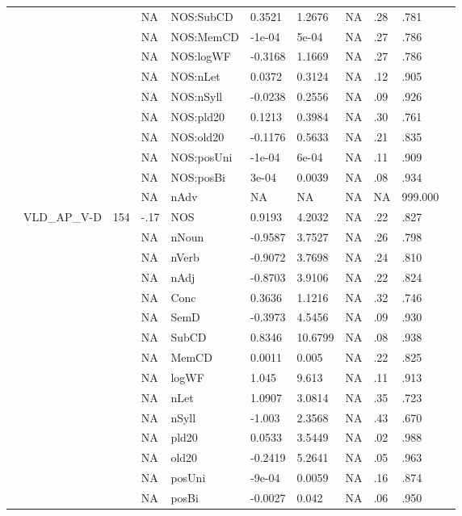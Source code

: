 \begin{table}[ht]
\begin{tabular}{lllllllllll}
   &  &  & NA & NOS:SubCD & 0.3521 & 1.2676 & NA & .28 & .781 &   \\ 
   &  &  & NA & NOS:MemCD & -1e-04 & 5e-04 & NA & .27 & .786 &   \\ 
   &  &  & NA & NOS:logWF & -0.3168 & 1.1669 & NA & .27 & .786 &   \\ 
   &  &  & NA & NOS:nLet & 0.0372 & 0.3124 & NA & .12 & .905 &   \\ 
   &  &  & NA & NOS:nSyll & -0.0238 & 0.2556 & NA & .09 & .926 &   \\ 
   &  &  & NA & NOS:pld20 & 0.1213 & 0.3984 & NA & .30 & .761 &   \\ 
   &  &  & NA & NOS:old20 & -0.1176 & 0.5633 & NA & .21 & .835 &   \\ 
   &  &  & NA & NOS:posUni & -1e-04 & 6e-04 & NA & .11 & .909 &   \\ 
   &  &  & NA & NOS:posBi & 3e-04 & 0.0039 & NA & .08 & .934 &   \\ 
   &  &  & NA & nAdv & NA & NA & NA & NA & 999.000 &  \\ 
   & VLD\_AP\_V-D & 154 & -.17 & NOS & 0.9193 & 4.2032 & NA & .22 & .827 &   \\ 
   &  &  & NA & nNoun & -0.9587 & 3.7527 & NA & .26 & .798 &   \\ 
   &  &  & NA & nVerb & -0.9072 & 3.7698 & NA & .24 & .810 &   \\ 
   &  &  & NA & nAdj & -0.8703 & 3.9106 & NA & .22 & .824 &   \\ 
   &  &  & NA & Conc & 0.3636 & 1.1216 & NA & .32 & .746 &   \\ 
   &  &  & NA & SemD & -0.3973 & 4.5456 & NA & .09 & .930 &   \\ 
   &  &  & NA & SubCD & 0.8346 & 10.6799 & NA & .08 & .938 &   \\ 
   &  &  & NA & MemCD & 0.0011 & 0.005 & NA & .22 & .825 &   \\ 
   &  &  & NA & logWF & 1.045 & 9.613 & NA & .11 & .913 &   \\ 
   &  &  & NA & nLet & 1.0907 & 3.0814 & NA & .35 & .723 &   \\ 
   &  &  & NA & nSyll & -1.003 & 2.3568 & NA & .43 & .670 &   \\ 
   &  &  & NA & pld20 & 0.0533 & 3.5449 & NA & .02 & .988 &   \\ 
   &  &  & NA & old20 & -0.2419 & 5.2641 & NA & .05 & .963 &   \\ 
   &  &  & NA & posUni & -9e-04 & 0.0059 & NA & .16 & .874 &   \\ 
   &  &  & NA & posBi & -0.0027 & 0.042 & NA & .06 & .950 &   \\ 

\end{tabular}
\end{table}
